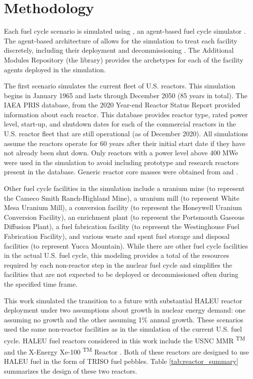 \section{Methodology}

Each fuel cycle scenario is simulated using \Cyclus, an 
agent-based fuel cycle simulator \cite{huff_fundamental_2016}. 
The agent-based architecture of \Cyclus allows for the simulation to treat
each facility discretely, including their deployment and 
decommissioning \cite{huff_fundamental_2016}. The \Cyclus 
Additional Modules Repository (the \Cycamore library) provides 
the archetypes for each of the facility agents deployed in the simulation.

The first scenario simulates the current fleet of U.S. reactors. This 
simulation begins in January 1965 and lasts through December 2050 (85 
years in total). The  \gls{IAEA} \gls{PRIS} database\cite{noauthor_power_1989},
from the 2020 
Year-end Reactor Status Report provided information about each reactor.
This database provides reactor type, rated power level, start-up, and 
shutdown dates for each of the commercial reactors in the U.S. reactor 
fleet
that are still operational (as of December 2020). All simulations assume 
the reactors operate for 60 years after their
initial start date if they have not already been shut down. Only reactors
with a power level above 400 MWe were 
used in the simulation to avoid including prototype and research reactors 
present in the database. Generic reactor core masses were obtained from 
\cite{todreas_nuclear_2012} and \cite{cacuci_handbook_2010}. 

Other fuel cycle facilities in the simulation include a uranium mine (to 
represent the Cameco Smith Ranch-Highland Mine), a uranium mill (to 
represent White Mesa Uranium Mill), a conversion facility (to represent 
the Honeywell Uranium Conversion Facility), an enrichment plant (to represent 
the Portsmouth Gaseous Diffusion Plant), a fuel fabrication facility (to 
represent the Westinghouse Fuel Fabrication Facility), and various waste and 
spent fuel storage and disposal facilities (to represent Yucca Mountain). 
While there
are other fuel cycle facilities in the actual U.S. fuel cycle, this 
modeling provides a total of the resources required 
by each non-reactor step in the nuclear fuel cycle and simplifies the 
facilities that are not expected to be deployed or decommissioned often 
during the specified time frame. 

This work simulated the transition to a future with substantial \gls{HALEU} 
reactor deployment under two assumptions about growth in nuclear energy 
demand: one assuming no growth and the other assuming 1\% annual growth.  
These scenarios used the same  
non-reactor facilities as in the simulation of the current 
U.S. fuel cycle. \gls{HALEU} fuel reactors 
considered in this work include the \gls{USNC} \gls{MMR} \textsuperscript{TM}
\cite{mitchell_usnc_2020} and the X-Energy Xe-100 \textsuperscript{TM} 
Reactor \cite{harlan_x-energy_2018}\cite{hussain_advances_2018}. Both of 
these reactors are designed 
to use \gls{HALEU} fuel in the form of \gls{TRISO} fuel pebbles. Table 
\ref{tab:reactor_summary} summarizes the design of these two reactors.

